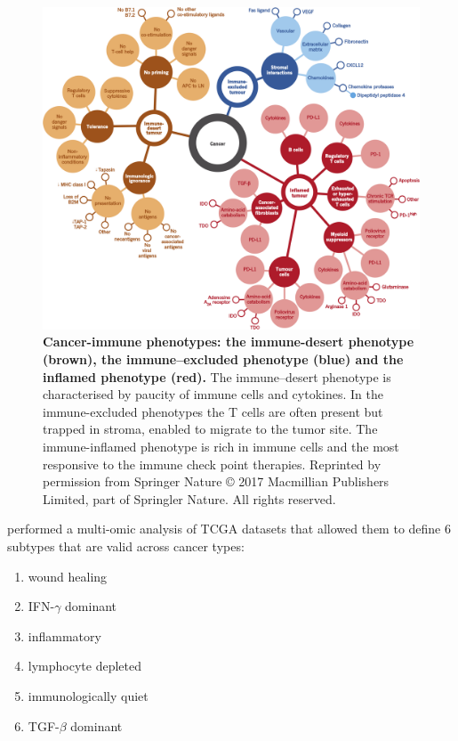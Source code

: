 \documentclass[12pt,]{book}
\providecommand{\tightlist}{%
  \setlength{\itemsep}{0pt}\setlength{\parskip}{0pt}}
\theoremstyle{definition}
\theoremstyle{definition}
\theoremstyle{definition}
\theoremstyle{remark}
\begin{document}
\begin{figure}

{\centering \includegraphics[width=1\linewidth]{figures-ext/immune-phenotypes} 

}

\caption{\textbf{Cancer-immune phenotypes: the
immune-desert phenotype (brown), the immune--excluded phenotype (blue)
and the inflamed phenotype (red).} The immune--desert phenotype is
characterised by paucity of immune cells and cytokines. In the
immune-excluded phenotypes the T cells are often present but trapped in
stroma, enabled to migrate to the tumor site. The immune-inflamed
phenotype is rich in immune cells and the most responsive to the immune
check point therapies. Reprinted by permission from Springer Nature
\citep{Chen2017} © 2017 Macmillian Publishers Limited, part of Springler
Nature. All rights reserved.}\label{fig:immune-phenotypes}
\end{figure}












\citet{Thorsson2018} performed a multi-omic analysis of TCGA datasets
that allowed them to define 6 subtypes that are valid across cancer
types:

\begin{enumerate}
\def\labelenumi{\arabic{enumi}.}
\tightlist
\item
  wound healing
\item
  IFN-\(\gamma\) dominant
\item
  inflammatory
\item
  lymphocyte depleted
\item
  immunologically quiet
\item
  TGF-\(\beta\) dominant
\end{enumerate}
\end{document}
